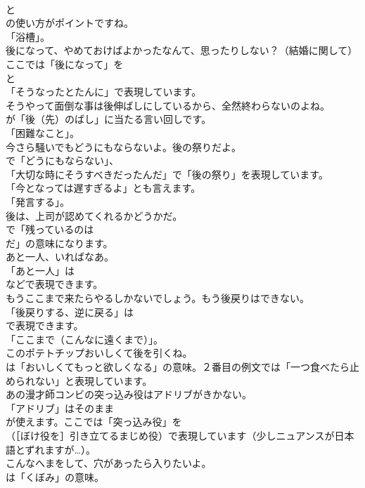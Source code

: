 \documentclass[8pt]{extreport}
\begin{document}
\begin{CJK}{UTF8}{min}
\\	と
\\	の使い方がポイントですね。
\\	「浴槽」。	
\\	後になって、やめておけばよかったなんて、思ったりしない？（結婚に関して） 
\\	ここでは「後になって」を
\\	と
\\	「そうなったとたんに」で表現しています。	
\\	そうやって面倒な事は後伸ばしにしているから、全然終わらないのよね。 
\\	が「後（先）のばし」に当たる言い回しです。
\\	「困難なこと」。	
\\	今さら騒いでもどうにもならないよ。後の祭りだよ。 
\\	で「どうにもならない」、
\\	「大切な時にそうすべきだったんだ」で「後の祭り」を表現しています。
\\	「今となっては遅すぎるよ」とも言えます。
\\	「発言する」。	
\\	後は、上司が認めてくれるかどうかだ。 
\\	で「残っているのは 
\\	だ」の意味になります。	
\\	あと一人、いればなあ。 
\\	「あと一人」は
\\	などで表現できます。	
\\	もうここまで来たらやるしかないでしょう。もう後戻りはできない。 
\\	「後戻りする、逆に戻る」は
\\	で表現できます。
\\	「ここまで（こんなに遠くまで）」。	
\\	このポテトチップおいしくて後を引くね。 
\\	は「おいしくてもっと欲しくなる」の意味。２番目の例文では「一つ食べたら止められない」と表現しています。	
\\	あの漫才師コンビの突っ込み役はアドリブがきかない。 
\\	「アドリブ」はそのまま
\\	が使えます。ここでは「突っ込み役」を 
\\	（［ぼけ役を］引き立てるまじめ役）で表現しています（少しニュアンスが日本語とずれますが…）。	
\\	こんなへまをして、穴があったら入りたいよ。 
\\	は「くぼみ」の意味。

\end{CJK}
\end{document}
